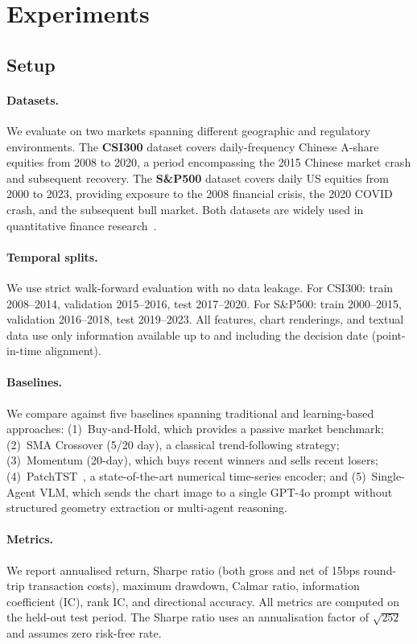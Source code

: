 \section{Experiments}
\label{sec:experiments}

\subsection{Setup}

\paragraph{Datasets.}
We evaluate on two markets spanning different geographic and regulatory environments. The \textbf{CSI300} dataset covers daily-frequency Chinese A-share equities from 2008 to 2020, a period encompassing the 2015 Chinese market crash and subsequent recovery. The \textbf{S\&P500} dataset covers daily US equities from 2000 to 2023, providing exposure to the 2008 financial crisis, the 2020 COVID crash, and the subsequent bull market. Both datasets are widely used in quantitative finance research~\cite{rdagent2025,fincon2024}.

\paragraph{Temporal splits.}
We use strict walk-forward evaluation with no data leakage. For CSI300: train 2008--2014, validation 2015--2016, test 2017--2020. For S\&P500: train 2000--2015, validation 2016--2018, test 2019--2023. All features, chart renderings, and textual data use only information available up to and including the decision date (point-in-time alignment).

\paragraph{Baselines.}
We compare against five baselines spanning traditional and learning-based approaches: (1)~Buy-and-Hold, which provides a passive market benchmark; (2)~SMA Crossover (5/20 day), a classical trend-following strategy; (3)~Momentum (20-day), which buys recent winners and sells recent losers; (4)~PatchTST~\cite{nie2023patchtst}, a state-of-the-art numerical time-series encoder; and (5)~Single-Agent VLM, which sends the chart image to a single GPT-4o prompt without structured geometry extraction or multi-agent reasoning.

\paragraph{Metrics.}
We report annualised return, Sharpe ratio (both gross and net of 15bps round-trip transaction costs), maximum drawdown, Calmar ratio, information coefficient (IC), rank IC, and directional accuracy. All metrics are computed on the held-out test period. The Sharpe ratio uses an annualisation factor of $\sqrt{252}$ and assumes zero risk-free rate.


